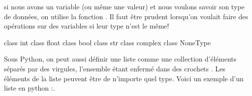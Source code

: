 \documentclass[letterpaper,10pt,french]{sphinxmanual}
\begin{document}
\sphinxAtStartPar
si nous avons un variable (ou même une valeur) et nous voulons savoir son type de données, on utilise la fonction . Il faut être prudent lorsqu’on voulait faire des opérations sur des variables si leur type n’est le même!

\begin{sphinxVerbatim}[commandchars=\\\{\}]



\end{sphinxVerbatim}

\begin{sphinxVerbatim}[commandchars=\\\{\}]
\PYGZlt{}class \PYGZsq{}int\PYGZsq{}\PYGZgt{}
\PYGZlt{}class \PYGZsq{}float\PYGZsq{}\PYGZgt{}
\PYGZlt{}class \PYGZsq{}bool\PYGZsq{}\PYGZgt{}
\PYGZlt{}class \PYGZsq{}str\PYGZsq{}\PYGZgt{}
\PYGZlt{}class \PYGZsq{}complex\PYGZsq{}\PYGZgt{}
\PYGZlt{}class \PYGZsq{}NoneType\PYGZsq{}\PYGZgt{}
\end{sphinxVerbatim}

\sphinxAtStartPar
Sous Python, on peut aussi définir une liste comme une collection d’éléments séparés par des virgules, l’ensemble étant enfermé dans des crochets \sphinxcode{\sphinxupquote{{[} {]}}}. Les éléments de la liste peuvent être de n’importe quel type. Voici un exemple d’un liste en python :.
\end{document}
